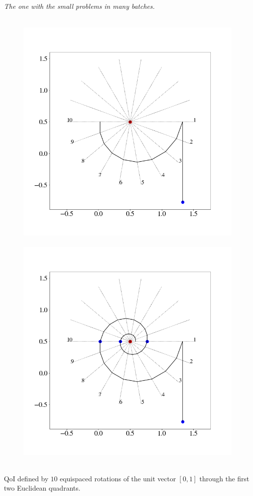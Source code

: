 \begin{frame}{\it The one with the small problems in many batches.}
\centering
\begin{figure}
  \centering
  \hbox{
  \includegraphics[width=0.5\linewidth]{figures/iterative/10D-firstepoch.png}
  \includegraphics[width=0.5\linewidth]{figures/iterative/10D-fewepochs.png}
  }
  \label{fig:iterative-linear-demo}
\end{figure}

QoI defined by $10$ equispaced rotations of the unit vector $[0, 1]$ through the first two Euclidean quadrants.
\end{frame}


